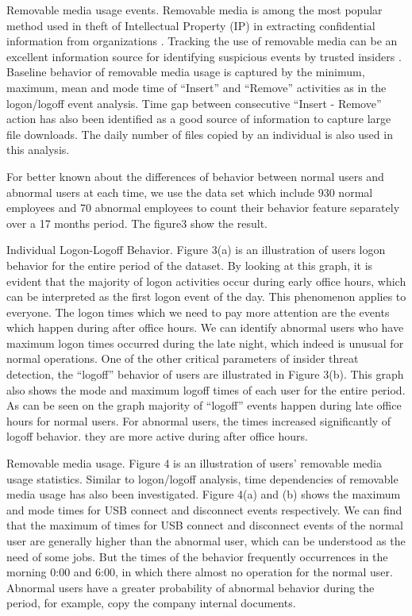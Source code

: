 \documentclass[conference]{IEEEtran}
\begin{document}
Removable media usage events. Removable media is among the most popular method used in theft of Intellectual Property (IP) in extracting confidential information from organizations \cite{b41}. Tracking the use of removable media can be an excellent information source for identifying suspicious events by trusted insiders . Baseline behavior of removable media usage is captured by the minimum, maximum, mean and mode time of “Insert” and “Remove” activities as in the logon/logoff event analysis. Time gap between consecutive “Insert - Remove” action has also been identified as a good source of information to capture large file downloads. The daily number of files copied by an individual is also used in this analysis.

For better known about the differences of behavior between normal users and abnormal users at each time, we use the data set which include 930 normal employees and 70 abnormal employees to count their behavior feature separately over a 17 months period. The figure3 show the result.

Individual Logon-Logoff Behavior. Figure 3(a) is an illustration of users logon behavior for the
entire period of the dataset. By looking at this graph, it is evident that the majority of logon activities occur during early office hours, which can be interpreted as the first logon event of the day. This phenomenon applies to everyone.  The logon times which we need to pay more attention are the events which happen during after office hours. We can identify abnormal users who have maximum logon times occurred during the late night, which indeed is unusual for normal operations. One of the other critical parameters of insider threat detection, the “logoff” behavior of users are illustrated in Figure 3(b). This graph also shows the mode and maximum logoff times of each user for the entire period. As can be seen on the graph majority of “logoff” events happen during late office hours for normal users. For abnormal users, the times increased significantly of logoff behavior. they are more active during after office hours.

Removable media usage. Figure 4 is an illustration of users’ removable media usage statistics.
Similar to logon/logoff analysis, time dependencies of removable media usage has also been investigated. Figure 4(a) and (b) shows the maximum and mode times for USB connect and disconnect events respectively. We can find that the maximum of times for USB connect and disconnect events of the normal user are generally higher than the abnormal user, which can be understood as the need of some jobs. But the times of the behavior frequently occurrences in the morning 0:00 and 6:00, in which  there almost no operation for the normal user.  Abnormal users have a greater probability of abnormal behavior during the period, for example, copy the company internal documents.
\end{document}
